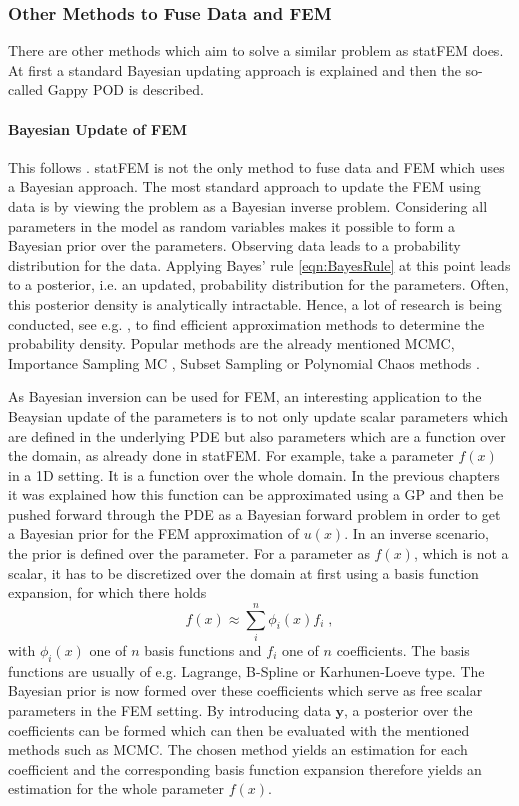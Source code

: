 \documentclass[%
  a4paper,oneside,%
  11pt,%
  smallchapters,
  style=printdev,
  extramargin,
  green,%
  rgb, <cmyk>
  ]{tubsbook}
\begin{document}
\subsubsection{Other Methods to Fuse Data and FEM}
There are other methods which aim to solve a similar problem as statFEM does.  At first a standard Bayesian updating approach is explained and then the so-called Gappy POD is described.
\paragraph{Bayesian Update of FEM}
This follows \cite[p.19-21]{girolami2021}.
statFEM is not the only method to fuse data and FEM which uses a Bayesian approach. The most standard approach to update the FEM using data is by viewing the problem as a Bayesian inverse problem. Considering all parameters in the model as random variables makes it possible to form a Bayesian prior over the parameters. Observing data leads to a probability distribution for the data. Applying Bayes' rule \eqref{eqn:BayesRule} at this point leads to a posterior, i.e. an updated, probability distribution for the parameters. Often, this posterior density is analytically intractable. Hence, a lot of research is being conducted, see e.g. \cite{Straub2015}, to find efficient approximation methods to determine the probability density. Popular methods are the already mentioned MCMC, Importance Sampling MC \cite{Glynn1989}, Subset Sampling \cite{Au2001} or Polynomial Chaos methods \cite{Crestaux2009}.

As Bayesian inversion can be used for FEM, an interesting application to the Beaysian update of the parameters is to not only update scalar parameters which are defined in the underlying PDE but also parameters which are a function over the domain, as already done in statFEM. For example, take a parameter $f(x)$ in a 1D setting. It is a function over the whole domain. In the previous chapters it was explained how this function can be approximated using a GP and then be pushed forward through the PDE as a Bayesian forward problem in order to get a Bayesian prior for the FEM approximation of $u(x)$. In an inverse scenario, the prior is defined over the parameter. For a parameter as $f(x)$, which is not a scalar, it has to be discretized over the domain at first using a basis function expansion, for which there holds
\begin{equation}
f(x) \approx \sum_i^n \phi_i(x)f_i \; ,
\end{equation}
with $\phi_i(x)$ one of $n$ basis functions and $f_i$ one of $n$ coefficients. The basis functions are usually of e.g. Lagrange, B-Spline or Karhunen-Loeve type. The Bayesian prior is now formed over these coefficients which serve as free scalar parameters in the FEM setting. By introducing data $\bm{y}$, a posterior over the coefficients can be formed which can then be evaluated with the mentioned methods such as MCMC. The chosen method yields an estimation for each coefficient and the corresponding basis function expansion therefore yields an estimation for the whole parameter $f(x)$.
\end{document}
